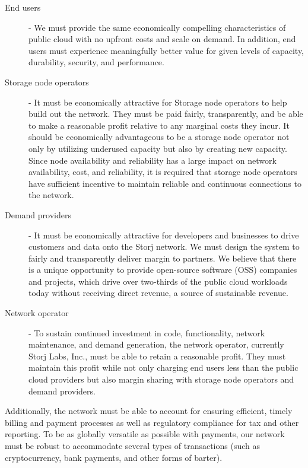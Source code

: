 \documentclass[8pt,fleqn,openany]{book}
\begin{document}
\begin{description}
\item[End users] - We must provide the same economically compelling
  characteristics of public cloud with no upfront costs and scale on demand.
  In addition, end users must experience meaningfully better value for given
  levels of capacity, durability, security, and performance.

\item[Storage node operators] - It must be economically attractive for Storage
  node operators to help build out the network.
  They must be paid fairly, transparently, and be able to make a
  reasonable profit relative to any marginal costs they incur.
  It should be economically advantageous to be a storage
  node operator not only by utilizing underused capacity but also by creating new capacity.
  Since node availability and reliability has a large impact on network
  availability, cost, and reliability, it is required that storage node
  operators have sufficient incentive to maintain reliable and continuous
  connections to the network.

\item[Demand providers] - It must be economically attractive for developers and
  businesses to drive customers and data onto the Storj network. We must design
  the system to fairly and transparently deliver margin to partners. We believe
  that there is a unique opportunity to provide open-source software (OSS)
  companies and projects, which drive over two-thirds of the public cloud workloads
  today without receiving direct revenue, a source of sustainable revenue.

\item[Network operator] - To sustain continued investment in code,
functionality, network maintenance, and demand generation, the network
operator, currently Storj Labs, Inc.,  must be able to retain a reasonable profit. They must maintain this profit while
not only charging end users less than the public cloud providers but also margin sharing
with storage node operators and demand providers.
\end{description}

Additionally, the network must be able to account for ensuring efficient, timely billing
and payment processes as well as regulatory compliance for tax and other reporting.
To be as globally versatile as possible with payments, our network must be robust to accommodate several types of transactions (such as cryptocurrency, bank payments, and other forms of barter).
\end{document}
